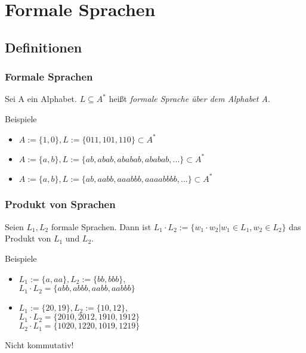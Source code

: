 \section{Formale Sprachen}
\subsection{Definitionen}
\begin{frame}
  \frametitle{Formale Sprachen}
  \begin{definition}
    Sei A ein Alphabet. $L \subseteq A^*$ heißt \emph{formale Sprache über dem Alphabet A}.
  \end{definition}\pause
  \begin{exampleblock}{Beispiele}
    \begin{itemize}
      \item $A := \{1, 0\}, L:= \{011, 101, 110\} \subset A^*$ \pause
      \item $A := \{a, b\}, L:= \{ab, abab, ababab, ababab, ...\} \subset A^*$ \pause
      \item $A := \{a, b\}, L:= \{ab, aabb, aaabbb, aaaabbbb, ...\} \subset A^*$
    \end{itemize}
  \end{exampleblock}
\end{frame}
\begin{frame}
  \frametitle{Produkt von Sprachen}
  \begin{definition}
    Seien $L_1, L_2$ formale Sprachen. Dann ist $L_1 \cdot L_2 := \{w_1 \cdot w_2 | w_1 \in L_1, w_2 \in L_2\}$ das Produkt von $L_1$ und $L_2$.
  \end{definition}\pause
  \begin{exampleblock}{Beispiele}
    \begin{itemize}
      \item $L_1 := \{a, aa\}, L_2 := \{bb, bbb\}$,\\
             $L_1 \cdot L_2 = \{abb, abbb, aabb, aabbb\}$ \pause
      \item $L_1 := \{20, 19\}, L_2 := \{10, 12\},$\\
             $L_1 \cdot L_2 = \{2010, 2012, 1910, 1912\}$\\
             $L_2 \cdot L_1 = \{1020, 1220, 1019, 1219\}$
    \end{itemize}
  \end{exampleblock}
  \begin{alertblock}{Nicht kommutativ!}
  \end{alertblock}
\end{frame}
